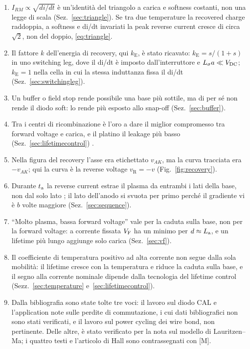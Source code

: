 \documentclass[10pt,a4paper]{scrartcl}
\let\newcommand\pdvaluedefine
\newcommand{\VF}{V_\mathrm{F}}
\newcommand{\ta}{t_\mathrm{a}}
\newcommand{\Ls}{L_\sigma}                    %
\newcommand{\La}{L_\mathrm{a}}
\newcommand{\Vdc}{V_\mathrm{DC}}
\newcommand{\Pp}{p\textsuperscript{+}}
\begin{document}
\begin{enumerate}
\item $I_{RM} \propto \sqrt{di/dt}$ è un'identità del triangolo a carica e softness costanti, non una legge di scala (Sez.~\ref{sec:triangle}). Se tra due temperature la recovered charge raddoppia, a softness e di/dt invariati la peak reverse current cresce di circa $\sqrt{2}$, non del doppio, \eqref{eq:triangle}.
\item Il fattore $k$ dell'energia di recovery, qui $k_\mathrm{E}$, è stato ricavato: $k_\mathrm{E} = s/(1+s)$ in uno switching leg, dove il di/dt è imposto dall'interruttore e $\Ls a \ll \Vdc$; $k_\mathrm{E} = 1$ nella cella in cui la stessa induttanza fissa il di/dt (Sez.~\ref{sec:switchingleg}).
\item Un buffer o field stop rende possibile una base più sottile, ma di per sé non rende il diodo soft: lo rende più esposto allo snap-off (Sez.~\ref{sec:buffer}).
\item Tra i centri di ricombinazione è l'oro a dare il miglior compromesso tra forward voltage e carica, e il platino il leakage più basso (Sez.~\ref{sec:lifetimecontrol}) \cite{baligasun1977}.
\item Nella figura del recovery l'asse era etichettato $v_{AK}$, ma la curva tracciata era $-v_{AK}$; qui la curva è la reverse voltage $v_\mathrm{R} = -v$ (Fig.~\ref{fig:recovery}).
\item Durante $\ta$ la reverse current estrae il plasma da entrambi i lati della base, non dal solo lato \Pp; il lato dell'anodo si svuota per primo perché il gradiente vi è $b$ volte maggiore (Sez.~\ref{sec:sequence}).
\item ``Molto plasma, bassa forward voltage'' vale per la caduta sulla base, non per la forward voltage: a corrente fissata $\VF$ ha un minimo per $d \approx \La$, e un lifetime più lungo aggiunge solo carica (Sez.~\ref{sec:vf}).
\item Il coefficiente di temperatura positivo ad alta corrente non segue dalla sola mobilità: il lifetime cresce con la temperatura e riduce la caduta sulla base, e il segno alla corrente nominale dipende dalla tecnologia del lifetime control (Sezz.~\ref{sec:temperature} e~\ref{sec:lifetimecontrol}).
\item Dalla bibliografia sono state tolte tre voci: il lavoro sul diodo CAL e l'application note sulle perdite di commutazione, i cui dati bibliografici non sono stati verificati, e il lavoro sul power cycling dei wire bond, non pertinente. Delle altre, \cite{lauritzen1991} è stato verificato per la nota sul modello di Lauritzen--Ma; i quattro testi e l'articolo di Hall sono contrassegnati con [M].
\end{enumerate}
\end{document}
